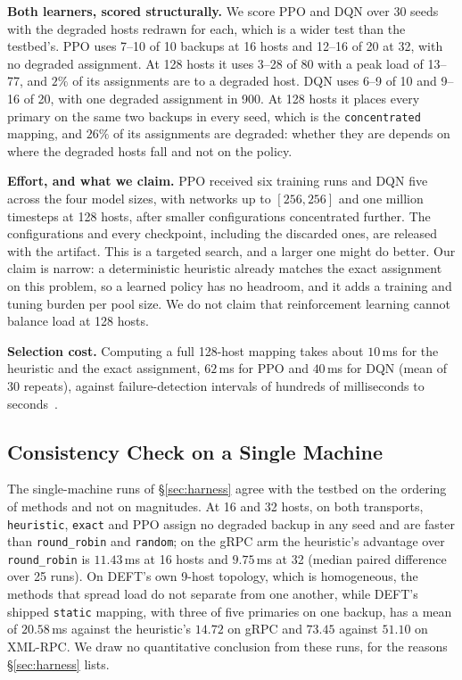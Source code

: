 \textbf{Both learners, scored structurally.} We score PPO and DQN over 30
seeds with the degraded hosts redrawn for each, which is a wider test than the
testbed's. PPO uses 7--10 of 10 backups at 16 hosts and 12--16 of 20 at 32,
with no degraded assignment. At 128 hosts it uses 3--28 of 80 with a peak load
of 13--77, and $2\%$ of its assignments are to a degraded host. DQN uses 6--9
of 10 and 9--16 of 20, with one degraded assignment in 900. At 128 hosts it
places every primary on the same two backups in every seed, which is the
\texttt{concentrated} mapping, and $26\%$ of its assignments are degraded:
whether they are depends on where the degraded hosts fall and not on the
policy.

\textbf{Effort, and what we claim.} PPO received six training runs and DQN five
across the four model sizes, with networks up to $[256,256]$ and one million
timesteps at 128 hosts, after smaller configurations concentrated further. The
configurations and every checkpoint, including the discarded ones, are released
with the artifact. This is a targeted search, and a larger one might do better.
Our claim is narrow: a deterministic heuristic already matches the exact
assignment on this problem, so a learned policy has no headroom, and it adds a
training and tuning burden per pool size. We do not claim that reinforcement
learning cannot balance load at 128 hosts.

\textbf{Selection cost.} Computing a full 128-host mapping takes about
$10$\,ms for the heuristic and the exact assignment, $62$\,ms for PPO and
$40$\,ms for DQN (mean of 30 repeats), against failure-detection intervals of
hundreds of milliseconds to
seconds~\cite{gill2011understanding,potharaju2013demystifying}.

\subsection{Consistency Check on a Single Machine}
\label{sec:single}

The single-machine runs of \S\ref{sec:harness} agree with the testbed on the
ordering of methods and not on magnitudes. At 16 and 32 hosts, on both
transports, \texttt{heuristic}, \texttt{exact} and PPO assign no degraded
backup in any seed and are faster than \texttt{round\_robin} and
\texttt{random}; on the gRPC arm the heuristic's advantage over
\texttt{round\_robin} is $11.43$\,ms at 16 hosts and $9.75$\,ms at 32 (median
paired difference over 25 runs). On DEFT's own 9-host topology, which is
homogeneous, the methods that spread load do not separate from one another,
while DEFT's shipped \texttt{static} mapping, with three of five primaries on
one backup, has a mean of $20.58$\,ms against the heuristic's $14.72$ on gRPC
and $73.45$ against $51.10$ on XML-RPC. We draw no quantitative conclusion from
these runs, for the reasons \S\ref{sec:harness} lists.
